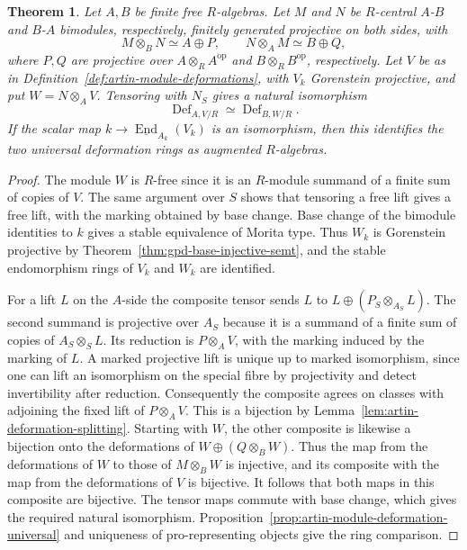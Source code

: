 \documentclass[12pt,a4paper,english,reqno]{amsart}
\numberwithin{equation}{section}
\theoremstyle{plain}
\newtheorem{theorem}{Theorem}[section]
\theoremstyle{definition}
\begin{document}
\begin{theorem}\label{thm:artin-module-deformation-morita}
Let $A,B$ be finite free $R$-algebras. Let $M$ and $N$ be
$R$-central $A$-$B$ and $B$-$A$ bimodules, respectively,
finitely generated projective on both sides, with
\[
 M\otimes_BN\simeq A\oplus P,\qquad
 N\otimes_AM\simeq B\oplus Q,
\]
where $P,Q$ are projective over $A\otimes_R A^{\mathrm{op}}$
and $B\otimes_R B^{\mathrm{op}}$, respectively.
Let $V$ be as in Definition~\ref{def:artin-module-deformations},
with $V_k$ Gorenstein projective, and put $W=N\otimes_A V$.
Tensoring with $N_S$ gives a natural isomorphism
\[
 \operatorname{Def}_{A,V/R}
       \simeq\operatorname{Def}_{B,W/R}.
\]
If the scalar map $k\to\underline{\operatorname{End}}_{A_k}(V_k)$
is an isomorphism, then this identifies the two universal
deformation rings as augmented $R$-algebras.
\end{theorem}

\begin{proof}
The module $W$ is $R$-free since it is an $R$-module summand of
a finite sum of copies of $V$. The same argument over $S$
shows that tensoring a free lift gives a free lift, with the
marking obtained by base change. Base change of the bimodule
identities to $k$ gives a stable equivalence of Morita type.
Thus $W_k$ is Gorenstein projective by
Theorem~\ref{thm:gpd-base-injective-semt}, and the stable
endomorphism rings of $V_k$ and $W_k$ are identified.

For a lift $L$ on the $A$-side the composite tensor sends
$L$ to $L\oplus(P_S\otimes_{A_S}L)$. The second summand is
projective over $A_S$ because it is a summand of a finite sum of
copies of $A_S\otimes_S L$. Its reduction is $P\otimes_AV$,
with the marking induced by the marking of $L$. A marked
projective lift is unique up to marked isomorphism, since
one can lift an isomorphism on the special fibre by
projectivity and detect invertibility after reduction.
Consequently the composite agrees on classes with adjoining
the fixed lift of $P\otimes_A V$. This is a bijection by
Lemma~\ref{lem:artin-deformation-splitting}. Starting with $W$,
the other composite is likewise a bijection onto the
deformations of $W\oplus(Q\otimes_B W)$. Thus the map from
the deformations of $W$ to those of $M\otimes_BW$ is
injective, and its composite with the map from the
deformations of $V$ is bijective. It follows that both
maps in this composite are bijective. The tensor maps
commute with base change, which gives the required
natural isomorphism. Proposition~\ref{prop:artin-module-deformation-universal}
and uniqueness of pro-representing objects give the ring
comparison.
\end{proof}
\end{document}
